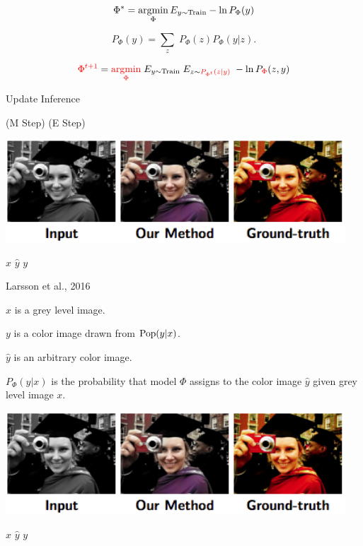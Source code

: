 {
{\color{red} $$\Phi^* = \operatorname*{argmin}_\Phi E_{y \sim \mathrm{Train}} -\ln P_\Phi(y)$$}

\vfill
{\color{red} $$P_\Phi(y) = \sum_z\;P_\Phi(z)P_\Phi(y|z).$$}

\vfill
$${\color{red} \Phi^{t+1}} =  {\color{red} \operatorname*{argmin}_\Phi}\;E_{y \sim \mathrm{Train}} \;E_{z \sim {\color{red} P_{\Phi^t}(z|y)}}\; - \ln P_{\color{red} \Phi}(z,y)$$
\centerline{\hspace{1em} Update \hspace{6em} Inference \hspace{2.5em}~}
\centerline{(M Step) \hspace{5em} (E Step) \hspace{1.5em}~}


\medskip
\centerline{\includegraphics[width = 5in]{../images/colorizationGreg2}}
\centerline{$x$ \hspace{4em} $\hat{y}$ \hspace{4em} $y$}
\centerline{\huge Larsson et al., 2016}

\vfill
$x$ is a grey level image.

\vfill
$y$ is a color image drawn from $\mathrm{Pop}(y|x)$.

\vfill
$\hat{y}$ is an arbitrary color image.

\vfill
$P_\Phi(\hat{y}|x)$ is the probability that model $\Phi$ assigns to the color image $\hat{y}$ given grey level image $x$.

\medskip
\centerline{\includegraphics[width = 5in]{../images/colorizationGreg2}}
\centerline{$x$ \hspace{4em} $\hat{y}$ \hspace{4em} $y$}

}
